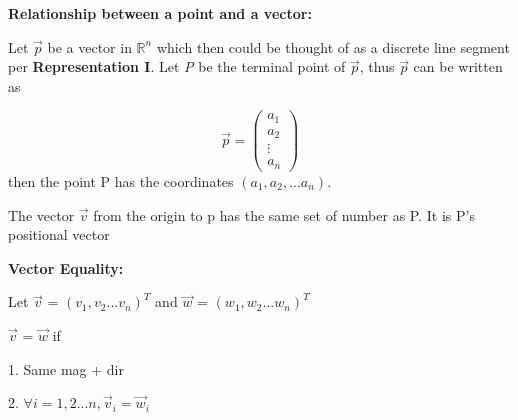 \documentclass{article}
\begin{document}
\medskip

\textbf{Relationship between a point and a vector:}

Let $\vec{p}$ be a vector in $\mathbb{R} ^ n$ which then could be thought of as 
a discrete line segment per \textbf{Representation I}. Let \emph{P} be the terminal point of
$\vec{p}$, thus $\vec{p}$ can be written as 

\[
  \vec{p} = \begin{pmatrix}
      a_1 \\
      a_2 \\
      \vdots \\
      a_n
  \end{pmatrix}  
\]
then the point P has the coordinates $(a_1, a_2, ... a_n)$.

The vector $\vec{v}$ from the origin to p has the same set of number as P. 
It is P's positional vector

\medskip

\textbf{Vector Equality: }

Let $\vec{v}$ = $(v_1, v_2...v_n)^T$ and $\vec{w}$ = $(w_1, w_2...w_n)^T$

$\vec{v}$ = $\vec{w}$ if

1. Same mag + dir

2. $\forall i = 1, 2 ... n, \vec{v}_i = \vec{w}_i$
\end{document}
